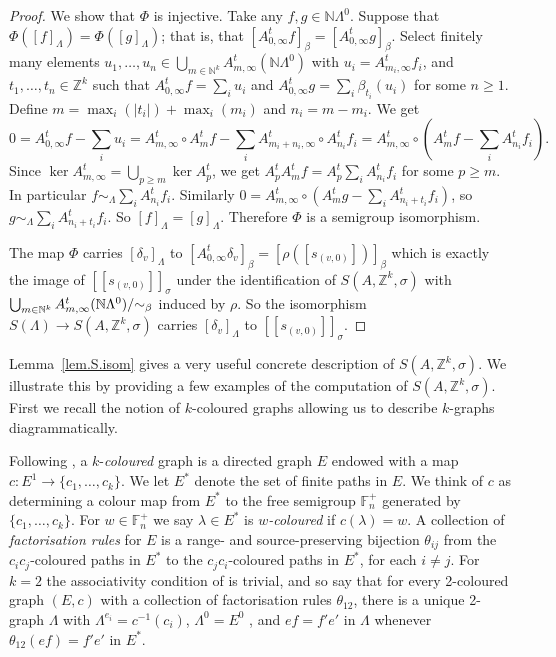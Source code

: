 \documentclass[a4paper, 12pt]{amsart}
\numberwithin{equation}{section}
\theoremstyle{remark}
\theoremstyle{definition}
\begin{document}
\begin{proof}
We show that $\Phi$ is injective. Take any $f,g\in {\mathbb{N}}\Lambda^0$. Suppose that
$\Phi({{[{f}]_\Lambda}})=\Phi({{[{g}]_\Lambda}})$; that is, that
$[A^t_{0,\infty}f]_\beta=[A^t_{0,\infty}g]_\beta$. Select finitely many elements
$u_1,\dots,u_n\in \bigcup_{m\in {\mathbb{N}}^k} A^t_{m,\infty} ({\mathbb{N}} \Lambda^0)$ with
$u_i=A^t_{m_i,\infty}f_i$, and $t_1,\dots,t_n\in {\mathbb{Z}}^k$ such that
$A^t_{0,\infty}f=\sum_iu_i$ and $A^t_{0,\infty}g=\sum_i\beta_{t_i}(u_i)$ for some $n\geq
1$. Define $m=\max_i(|t_i|)+\max_i(m_i)$ and $n_i=m-m_i$. We get
$$\textstyle{0=A^t_{0,\infty}f-\sum_iu_i=A^t_{m,\infty} \circ A^t_mf-\sum_iA^t_{m_i+n_i,\infty} \circ A^t_{n_i}f_i=A^t_{m,\infty} \circ (A^t_mf-\sum_i A^t_{n_i}f_i).}$$
Since $\ker A^t_{m,\infty}=\bigcup_{p\geq m}\ker A^t_p$, we get $A^t_pA^t_mf=A^t_p\sum_i
A^t_{n_i}f_i$ for some $p\geq m$. In particular $f \sim_\Lambda \sum_i A^t_{n_i}f_i$.
Similarly $0=A^t_{m,\infty} \circ (A^t_mg-\sum_i A^t_{n_i+t_i}f_i)$, so $g \sim_\Lambda
\sum_i A^t_{n_i+t_i}f_i$. So ${{[{f}]_\Lambda}}={{[{g}]_\Lambda}}$. Therefore $\Phi$ is a semigroup
isomorphism.

The map $\Phi$ carries ${{[{\delta_v}]_\Lambda}}$ to $[A^t_{0,\infty}\delta_v]_\beta=[\rho([s_{(v,0)}])]_\beta$ which is exactly the image of $[[s_{(v,0)}]]_\sigma$ under the identification of $S(A,{\mathbb{Z}}^k,\sigma)$ with $\bigcup_{m\in {\mathbb{N}}^k} A^t_{m,\infty} ({\mathbb{N}} \Lambda^0)/{\negthickspace}\sim_\beta$ induced by $\rho$. So the isomorphism $S(\Lambda)\to S(A,{\mathbb{Z}}^k,\sigma)$ carries ${{[{\delta_v}]_\Lambda}}$ to $[[s_{(v,0)}]]_\sigma$.
\end{proof}

Lemma~\ref{lem.S.isom} gives a very useful concrete description of $S(A,{\mathbb{Z}}^k,\sigma)$.
We illustrate this by providing a few examples of the computation of $S(A,{\mathbb{Z}}^k,\sigma)$.
First we recall the notion of $k$-coloured graphs allowing us to describe $k$-graphs
diagrammatically.

Following \cite{MR3056660}, a $k$-\emph{coloured} graph is a directed graph $E$ endowed
with a map $c \colon E^1 \to \{c_1, \dots, c_k\}$. We let $E^*$ denote the set of finite
paths in $E$. We think of $c$ as determining a colour map from $E^*$ to the free
semigroup ${\mathbb{F}}_n^+$ generated by $\{c_1, \dots, c_k\}$.  For $w\in {\mathbb{F}}_n^+$ we say
$\lambda\in E^*$ is \emph{$w$-coloured} if $c(\lambda) = w$. A collection of
\emph{factorisation rules} for $E$ is a range- and source-preserving bijection
$\theta_{ij}$ from the $c_ic_j$-coloured paths in $E^*$ to the $c_jc_i$-coloured paths in
$E^*$, for each $i\neq j$. For $k = 2$ the associativity condition of \cite{MR3056660} is
trivial, and so \cite[Theorems 4.4 and 4.5]{MR3056660} say that for every 2-coloured
graph $(E, c)$ with a collection of factorisation rules $\theta_{12}$, there is a unique
2-graph $\Lambda$ with  $\Lambda^{e_i}=c^{-1}(c_i)$, $\Lambda^0=E^0$ , and $ef=f'e'$ in
$\Lambda$ whenever $\theta_{12}(ef)=f'e'$ in $E^*$.
\end{document}
